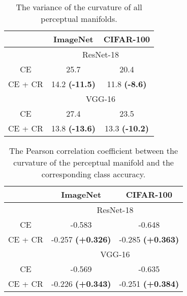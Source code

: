 \documentclass[10pt,twocolumn,letterpaper]{article}
\begin{document}
\begin{table}[h]
\centering 
\renewcommand\arraystretch{1.0}
\vskip -0.05in
\setlength{\tabcolsep}{17pt} \caption{The variance of the curvature of all perceptual manifolds.}
\vskip -0.07in
\label{table4}
\begin{tabular}{l|cc}
\hline  \toprule
                              & \multicolumn{1}{c|}{ImageNet} & CIFAR-100 \\ \hline
                              & \multicolumn{2}{c}{ResNet-18}            \\ \hline
\multicolumn{1}{c|}{CE}      & \multicolumn{1}{c|}{25.7}     & 20.4      \\ \hline
\multicolumn{1}{c|}{CE + CR} & \multicolumn{1}{c|}{14.2 \textcolor[RGB]{255,0,0}{\textbf{(-11.5)}}}     & 11.8 \textcolor[RGB]{255,0,0}{\textbf{(-8.6)}}      \\  \hline

                              & \multicolumn{2}{c}{VGG-16}            \\ \hline
\multicolumn{1}{c|}{CE}      & \multicolumn{1}{c|}{27.4}     & 23.5      \\ \hline
\multicolumn{1}{c|}{CE + CR} & \multicolumn{1}{c|}{13.8 \textcolor[RGB]{255,0,0}{\textbf{(-13.6)}}}     & 13.3 \textcolor[RGB]{255,0,0}{\textbf{(-10.2)}}      \\ 
\bottomrule \hline
\end{tabular}
\vskip -0.2in
\end{table}



\begin{table}[h]
\centering 
\renewcommand\arraystretch{1.0}
\setlength{\tabcolsep}{11.7pt} \caption{The Pearson correlation coefficient between the curvature of the perceptual manifold and the corresponding class accuracy.}
\vskip -0.07in
\label{table5}
\begin{tabular}{l|cc}
\hline  \toprule
                              & \multicolumn{1}{c|}{ImageNet} & CIFAR-100 \\ \hline
                              & \multicolumn{2}{c}{ResNet-18}            \\ \hline
\multicolumn{1}{c|}{CE}      & \multicolumn{1}{c|}{-0.583}     & -0.648      \\ \hline
\multicolumn{1}{c|}{CE + CR} & \multicolumn{1}{c|}{-0.257 \textcolor[RGB]{0,201,87}{\textbf{(+0.326)}}}    & -0.285 \textcolor[RGB]{0,201,87}{\textbf{(+0.363)}}     \\  \hline

                              & \multicolumn{2}{c}{VGG-16}            \\ \hline
\multicolumn{1}{c|}{CE}      & \multicolumn{1}{c|}{-0.569}     & -0.635      \\ \hline
\multicolumn{1}{c|}{CE + CR} & \multicolumn{1}{c|}{-0.226 \textcolor[RGB]{0,201,87}{\textbf{(+0.343)}} }    & -0.251 \textcolor[RGB]{0,201,87}{\textbf{(+0.384)}}     \\ 
\bottomrule \hline
\end{tabular}
\vskip -0.05in
\end{table}
\end{document}
